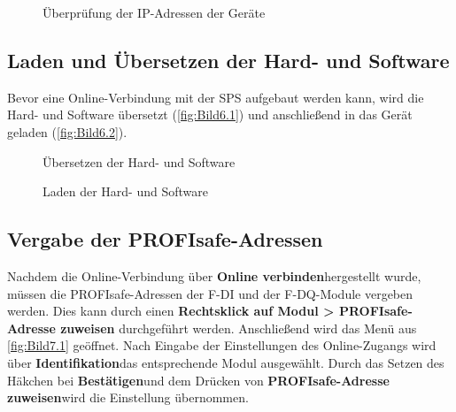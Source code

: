 \begin{figure}[H]
   \centering
   \caption[Überprüfung der IP-Adressen der Geräte]{Überprüfung der IP-Adressen der Geräte}
   \label{fig:Bild5.4}
\end{figure}

\subsection{Laden und Übersetzen der Hard- und Software} \label{sec: laden_und_uebersetzen}

Bevor eine Online-Verbindung mit der SPS aufgebaut werden kann, wird die Hard- und Software übersetzt (\autoref{fig:Bild6.1}) und anschließend in das Gerät geladen (\autoref{fig:Bild6.2}).

\begin{figure}[H]
   \centering
   \caption[Übersetzen der Hard- und Software]{Übersetzen der Hard- und Software}
   \label{fig:Bild6.1}
\end{figure}

\begin{figure}[H]
   \centering
   \caption[Laden der Hard- und Software]{Laden der Hard- und Software}
   \label{fig:Bild6.2}
\end{figure}

\subsection{Vergabe der PROFIsafe-Adressen} \label{sec: vergabe der profisafe-adressen}

Nachdem die Online-Verbindung über \glqq\textbf{Online verbinden}\grqq\:hergestellt wurde, müssen die PROFIsafe-Adressen der F-DI und der F-DQ-Module vergeben werden. Dies kann durch einen \textbf{Rechtsklick auf Modul > PROFIsafe-Adresse zuweisen} durchgeführt werden. Anschließend wird das Menü aus \autoref{fig:Bild7.1} geöffnet. Nach Eingabe der Einstellungen des Online-Zugangs wird über \glqq\textbf{Identifikation}\grqq\:das entsprechende Modul ausgewählt. Durch das Setzen des Häkchen bei \glqq\textbf{Bestätigen}\grqq\:und dem Drücken von \glqq\textbf{PROFIsafe-Adresse zuweisen}\grqq\:wird die Einstellung übernommen.

